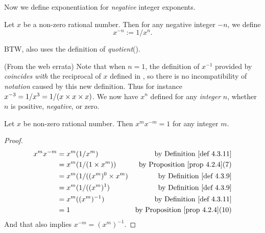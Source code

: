 Now we define exponentiation for \emph{negative} integer exponents.

\begin{definition}  \label{def 4.3.11}
Let \(x\) be a non-zero rational number.
Then for any negative integer \(-n\), we define
\[
    x^{-n} := 1/x^n.
\]
\end{definition}

\begin{note}
BTW,  also uses the definition of \emph{quotient}().

(From the web errata) Note that when \(n = 1\), the definition of \(x^{-1}\) provided by  \emph{coincides with} the reciprocal of \(x\) defined in , so there is no incompatibility of \emph{notation}  caused by this new definition.
Thus for instance \(x^{-3} = 1/x^3 = 1/(x \times x \times x)\).
We now have \(x^n\) defined for any \emph{integer} \(n\), whether \(n\) is positive, \emph{negative}, or zero.
\end{note}

\begin{additional corollary} \label{ac 4.3.3}
Let \(x\) be non-zero rational number.
Then \(x^m x^{-m} = 1\) for any integer \(m\).
\end{additional corollary}

\begin{proof}
\begin{align*}
    x^m x^{-m} & = x^m (1 / x^m) & \text{by \DEF{4.3.11}} \\
               & = x^m (1 / (1 \X x^m)) & \text{by \PROP{4.2.4}(7)} \\
               & = x^m (1 / ((x^m)^0 \X x^m) & \text{by \DEF{4.3.9}} \\
               & = x^m (1 / ((x^m)^1) & \text{by \DEF{4.3.9}} \\
               & = x^m ((x^m)^{-1}) & \text{by \DEF{4.3.11}} \\
               & = 1 & \text{by \PROP{4.2.4}(10)}
\end{align*}
And that also implies \(x^{-m} = (x^m)^{-1}\).
\end{proof}

